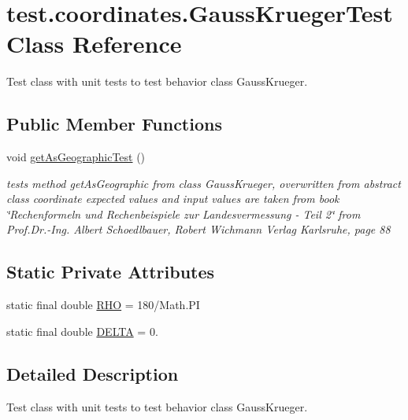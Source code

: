 \hypertarget{classtest_1_1coordinates_1_1_gauss_krueger_test}{}\section{test.\+coordinates.\+Gauss\+Krueger\+Test Class Reference}
\label{classtest_1_1coordinates_1_1_gauss_krueger_test}


Test class with unit tests to test behavior class Gauss\+Krueger.  


\subsection*{Public Member Functions}
\begin{DoxyCompactItemize}
\item 
void \hyperlink{classtest_1_1coordinates_1_1_gauss_krueger_test_a5fbfea508e96e4ad2be2aba1d27e85cc}{get\+As\+Geographic\+Test} ()
\begin{DoxyCompactList}\small\item\em tests method get\+As\+Geographic from class Gauss\+Krueger, overwritten from abstract class coordinate expected values and input values are taken from book \char`\"{}\+Rechenformeln und Rechenbeispiele zur Landesvermessung -\/ Teil 2\char`\"{} from Prof.\+Dr.-\/\+Ing. Albert Schoedlbauer, Robert Wichmann Verlag Karlsruhe, page 88 \end{DoxyCompactList}\end{DoxyCompactItemize}
\subsection*{Static Private Attributes}
\begin{DoxyCompactItemize}
\item 
static final double \hyperlink{classtest_1_1coordinates_1_1_gauss_krueger_test_aa03e906f12c6081dcd86c456f3a7b8f0}{R\+HO} = 180/Math.\+PI
\item 
static final double \hyperlink{classtest_1_1coordinates_1_1_gauss_krueger_test_a226dbd7a3e821d48e9889c1753a8f52d}{D\+E\+L\+TA} = 0.
\end{DoxyCompactItemize}


\subsection{Detailed Description}
Test class with unit tests to test behavior class Gauss\+Krueger. 

